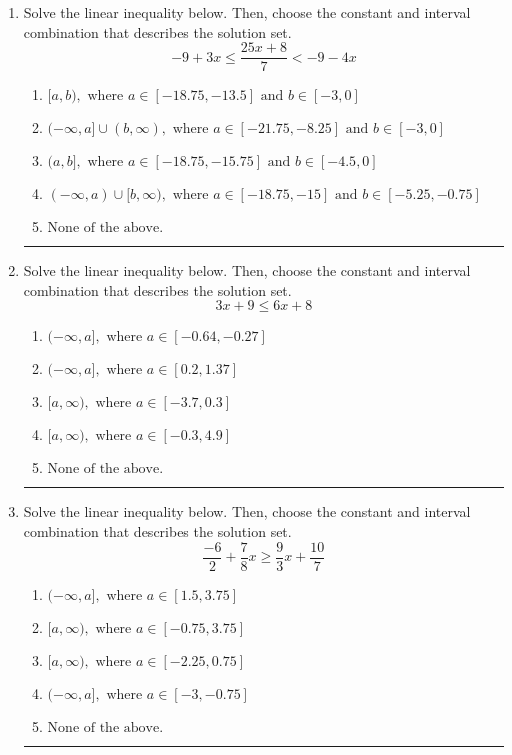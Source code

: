 \documentclass[14pt]{extbook}
\newcommand{\litem}[1]{\item#1\hspace*{-1cm}\rule{\textwidth}{0.4pt}}
\begin{document}
\begin{enumerate}
{\begin{enumerate}[label=\Alph*.]
\end{enumerate} }
\litem{
Solve the linear inequality below. Then, choose the constant and interval combination that describes the solution set.\[ -9 + 3 x \leq \frac{25 x + 8}{7} < -9 - 4 x \]\begin{enumerate}[label=\Alph*.]
\item \( [a, b), \text{ where } a \in [-18.75, -13.5] \text{ and } b \in [-3, 0] \)
\item \( (-\infty, a] \cup (b, \infty), \text{ where } a \in [-21.75, -8.25] \text{ and } b \in [-3, 0] \)
\item \( (a, b], \text{ where } a \in [-18.75, -15.75] \text{ and } b \in [-4.5, 0] \)
\item \( (-\infty, a) \cup [b, \infty), \text{ where } a \in [-18.75, -15] \text{ and } b \in [-5.25, -0.75] \)
\item \( \text{None of the above.} \)

\end{enumerate} }
\litem{
Solve the linear inequality below. Then, choose the constant and interval combination that describes the solution set.\[ 3x + 9 \leq 6x + 8 \]\begin{enumerate}[label=\Alph*.]
\item \( (-\infty, a], \text{ where } a \in [-0.64, -0.27] \)
\item \( (-\infty, a], \text{ where } a \in [0.2, 1.37] \)
\item \( [a, \infty), \text{ where } a \in [-3.7, 0.3] \)
\item \( [a, \infty), \text{ where } a \in [-0.3, 4.9] \)
\item \( \text{None of the above}. \)

\end{enumerate} }
\litem{
Solve the linear inequality below. Then, choose the constant and interval combination that describes the solution set.\[ \frac{-6}{2} + \frac{7}{8} x \geq \frac{9}{3} x + \frac{10}{7} \]\begin{enumerate}[label=\Alph*.]
\item \( (-\infty, a], \text{ where } a \in [1.5, 3.75] \)
\item \( [a, \infty), \text{ where } a \in [-0.75, 3.75] \)
\item \( [a, \infty), \text{ where } a \in [-2.25, 0.75] \)
\item \( (-\infty, a], \text{ where } a \in [-3, -0.75] \)
\item \( \text{None of the above}. \)

\end{enumerate} }
\end{enumerate}
\end{document}
